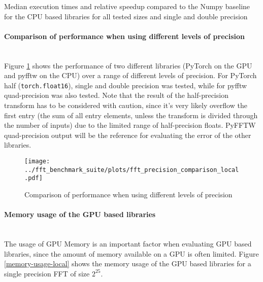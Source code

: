 \documentclass[english,11pt,a4paper,table]{article} %
\begin{document}
\begin{table}
	\centering
	\begin{footnotesize}
	
	\end{footnotesize}
	\caption{Median execution times and relative speedup compared to the Numpy baseline for the CPU based libraries for all tested sizes and single and double precision}
	\label{complete-fft-table-gpu}
\end{table}

\paragraph{Comparison of performance when using different levels of precision}\mbox{}\\

Figure \ref{precision-comparison} shows the performance of two different libraries (PyTorch on the GPU and pyfftw on the CPU) over a range of different levels of precision.
For PyTorch half (\texttt{torch.float16}), single and double precision was tested, while for pyfftw quad-precision was also tested.
Note that the result of the half-precision transform has to be considered with caution, since it's very likely overflow the first entry (the sum of all entry elements, unless the transform is divided through the number of inputs) due to the limited range of half-precision floats. \cite{cuFFT}
PyFFTW quad-precision output will be the reference for evaluating the error of the other libraries.

\begin{figure}[H]
	\texttt{[image: ../fft\_benchmark\_suite/plots/fft\_precision\_comparison\_local.pdf]}
	\caption{Comparison of performance when using different levels of precision}
	\label{precision-comparison}
\end{figure}

\paragraph{Memory usage of the GPU based libraries}\mbox{}\\

The usage of GPU Memory is an important factor when evaluating GPU based libraries, since the amount of memory available on a GPU is often limited.
Figure \ref{memory-usage-local} shows the memory usage of the GPU based libraries for a single precision FFT of size $2^{25}$.
\end{document}
